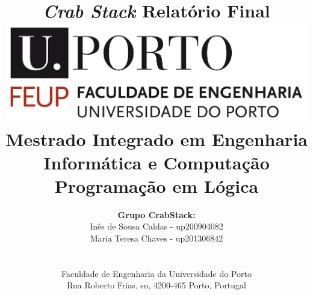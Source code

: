 \documentclass[a4paper]{article}
\begin{document}
\setlength{\textwidth}{16cm}
\setlength{\textheight}{22cm}

\title{\Huge\textbf{\textit{Crab Stack}}\linebreak\linebreak\linebreak
\Large\textbf{Relatório Final}\linebreak\linebreak
\linebreak\linebreak
\includegraphics[scale=0.1]{img/feup-logo.png}\linebreak\linebreak
\linebreak\linebreak
\Large{Mestrado Integrado em Engenharia Informática e Computação} \linebreak\linebreak
\Large{Programação em Lógica}\linebreak
}

\author{\textbf{Grupo Crab\textunderscore Stack:}\\
Inês de Sousa Caldas - up200904082 \\
Maria Teresa Chaves - up201306842 \\
\linebreak\linebreak \\
 \\ Faculdade de Engenharia da Universidade do Porto \\ Rua Roberto Frias, s\/n, 4200-465 Porto, Portugal \linebreak\linebreak\linebreak
\linebreak\linebreak\vspace{1cm}}

\maketitle
\thispagestyle{empty}
\end{document}
